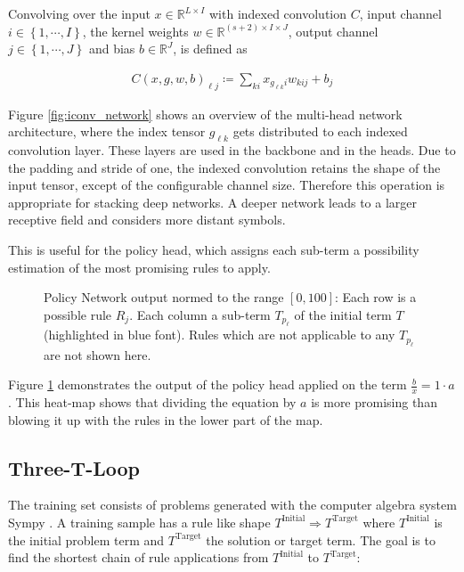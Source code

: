 \documentclass{scrartcl}
\theoremstyle{definition}
\begin{document}
Convolving over the input $x \in \mathbb{R}^{L\times I}$ with indexed convolution $C$, input channel $i \in \left\{1,\cdots,I \right\}$,
the kernel weights $w \in \mathbb{R}^{\left( s+2 \right)\times I \times J}$, output channel $j \in \left\{1,\cdots,J\right\}$ and bias $b \in \mathbb{R}^J$,
is defined as

\begin{align}
	C\left( x, g, w, b \right)_{\ell j} \coloneqq \sum_{ki}x_{g_{\ell k}i} w_{kij}+b_j
\end{align}

Figure \ref{fig:iconv_network} shows an overview of the multi-head network architecture, where the index tensor $g_{\ell k}$ gets distributed to each indexed convolution layer.
These layers are used in the backbone and in the heads.
Due to the padding and stride of one, the indexed convolution retains the shape of the input tensor, except of the configurable channel size.
Therefore this operation is appropriate for stacking deep networks.
A deeper network leads to a larger receptive field and considers more distant symbols.

This is useful for the policy head, which assigns each sub-term a possibility estimation of the most promising rules to apply.

\begin{figure}[!htbp]
	\centering
	
	\caption{Policy Network output normed to the range $[0,100]$: Each row is a possible rule $R_j$. Each column a sub-term $T_{p_\ell}$ of the initial term $T$ (highlighted in blue font).
	Rules which are not applicable to any $T_{p_\ell}$ are not shown here.
	}
	\label{fig:network_output}
\end{figure}

Figure \ref{fig:network_output} demonstrates the output of the policy head applied on the term $\frac{b}{x}=1\cdot a$.
This heat-map shows that dividing the equation by $a$ is more promising than blowing it up with the rules in the lower part of the map.


\subsection{Three-T-Loop}

The training set consists of problems generated with the computer algebra system Sympy \cite{10.7717/peerj-cs.103}.
A training sample has a rule like shape $T^\text{Initial} \Longrightarrow T^\text{Target}$ where $T^\text{Initial}$ is the initial problem term and $T^\text{Target}$ the solution or target term.
The goal is to find the shortest chain of rule applications from $T^\text{Initial}$ to $T^\text{Target}$:
\end{document}
